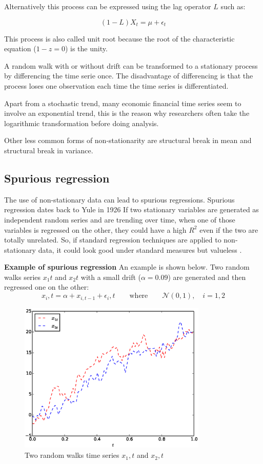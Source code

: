 Alternatively this process can be expressed using the lag operator $L$ such as:

\[
(1-L) X_t = \mu  + \epsilon_t
\]

This process is also called unit root because the root of the characteristic equation ($1-z = 0$) is the unity.  

A random walk with or without drift can be transformed to a stationary process by differencing the time serie once. The disadvantage of differencing is that the process loses one observation each time the time series is differentiated.

Apart from a stochastic trend, many economic financial time series seem to involve an exponential trend, this is the reason why researchers often take the logarithmic transformation before doing analysis.

Other less common forms of non-stationarity are structural break in mean and structural break in variance. 

\newpage
\subsection{Spurious regression} \label{sec:spurious}
The use
of non-stationary data can lead to spurious regressions. Spurious regression
dates back to Yule in 1926 \cite{yule1926} If two stationary
variables are generated as independent random series and are trending over time,
when one of those variables is regressed on the other, they could have a high
$R^2$ even if the two are totally unrelated. So, if standard regression
techniques are applied to non-stationary data, it could look good under standard
measures but valueless \cite{brooks2002}.

\textbf{Example of spurious regression} \quad 
An example is shown below. Two random walks series $x_1t$ and $x_2t$ with a small drift ($\alpha=0.09$) are generated and
then regressed one on the other:
 \begin{equation}
 x_i,t = \alpha + x_{i,t-1} + \epsilon_i,t  \qquad \text{where} \qquad \mathcal{N}(0,1), \quad i=1,2
 \end{equation}

\begin{figure}[!h]
  \centering
  \includegraphics[width=0.8\textwidth]{img/spurious1}
  \caption{Two random walks time series $x_1,t$ and $x_2,t$}
  \label{fig:spurious1}
\end{figure}

